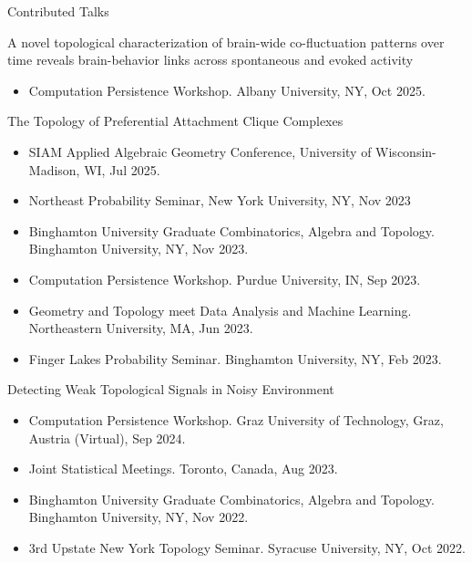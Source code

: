\documentclass{resume} %
\begin{document}
\iffalse
\begin{rSection}{Contributed Talks}

A novel topological characterization of brain-wide co-fluctuation patterns over time reveals brain-behavior links across spontaneous and evoked activity
\begin{itemize}[noitemsep]
    \item Computation Persistence Workshop. Albany University, NY, Oct 2025.
\end{itemize}


The Topology of Preferential Attachment Clique Complexes

\begin{itemize}[noitemsep]
    \item SIAM Applied Algebraic Geometry Conference, University of Wisconsin-Madison, WI, Jul 2025.
    \item Northeast Probability Seminar, New York University, NY, Nov 2023
    \item Binghamton University Graduate Combinatorics, Algebra and Topology. Binghamton University, NY, Nov 2023.
    \item Computation Persistence Workshop. Purdue University, IN, Sep 2023.
    \item Geometry and Topology meet Data Analysis and Machine Learning. Northeastern University, MA, Jun 2023.
    \item Finger Lakes Probability Seminar. Binghamton University, NY, Feb 2023.
\end{itemize}

Detecting Weak Topological Signals in Noisy Environment

\begin{itemize}[noitemsep]
    \item Computation Persistence Workshop. Graz University of Technology, Graz, Austria (Virtual), Sep 2024.
    \item Joint Statistical Meetings. Toronto, Canada, Aug 2023.
    \item Binghamton University Graduate Combinatorics, Algebra and Topology. Binghamton University, NY, Nov 2022.
    \item 3rd Upstate New York Topology Seminar. Syracuse University, NY, Oct 2022.
\end{itemize}
\end{rSection}

\newpage
\end{document}
